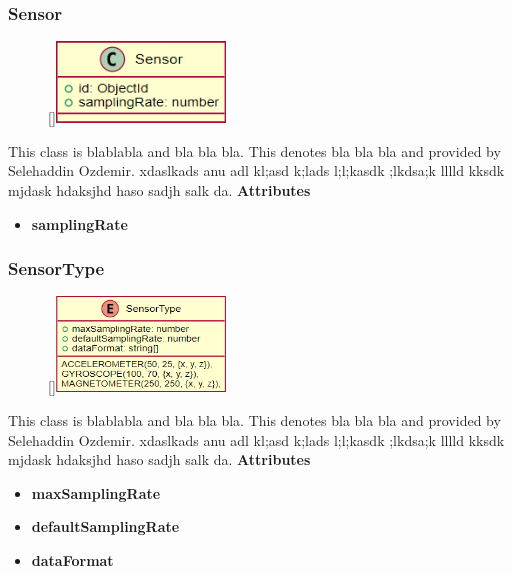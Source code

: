 \subsubsection{Sensor}
\begin{figure}
    \raisebox{0pt}[\dimexpr{}\baselineskip\relax]{\includegraphics[width=4.5cm]{classes/workspace-management/3.png}}
\end{figure} 
\par
This class is blablabla and bla bla bla. This denotes bla bla bla and provided by Selehaddin Ozdemir. xdaslkads anu adl kl;asd k;lads l;l;kasdk ;lkdsa;k lllld kksdk mjdask hdaksjhd haso sadjh salk da.
\newline
\newline
\textbf{Attributes}
\begin{itemize}
    \item \textbf{samplingRate}
\end{itemize}

\subsubsection{SensorType}
\begin{figure}
    \raisebox{0pt}[\dimexpr{}\baselineskip\relax]{\includegraphics[width=4.5cm]{classes/workspace-management/4.png}}
\end{figure} 
\par
This class is blablabla and bla bla bla. This denotes bla bla bla and provided by Selehaddin Ozdemir. xdaslkads anu adl kl;asd k;lads l;l;kasdk ;lkdsa;k lllld kksdk mjdask hdaksjhd haso sadjh salk da.
\newline
\newline
\textbf{Attributes}
\begin{itemize}
    \item \textbf{maxSamplingRate}
    \item \textbf{defaultSamplingRate}
    \item \textbf{dataFormat}
\end{itemize}

